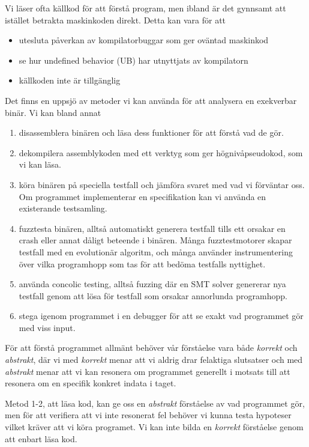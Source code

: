 
Vi läser ofta källkod för att förstå program, men ibland är det gynnsamt att istället betrakta
maskinkoden direkt. Detta kan vara för att
\begin{itemize}
  \item utesluta påverkan av kompilatorbuggar som ger oväntad maskinkod
  \item se hur undefined behavior (UB) har utnyttjats av kompilatorn
  \item källkoden inte är tillgänglig
\end{itemize}

Det finns en uppsjö av metoder vi kan använda för att analysera en exekverbar binär. Vi kan bland
annat
\begin{enumerate}
  \item disassemblera binären och läsa dess funktioner för att förstå vad de gör.
  \item dekompilera assemblykoden med ett verktyg som ger högnivåpseudokod, som vi kan läsa.
  \item köra binären på speciella testfall och jämföra svaret med vad vi förväntar oss. Om
    programmet implementerar en specifikation kan vi använda en existerande testsamling.
  \item fuzztesta binären, alltså automatiskt generera testfall tills ett orsakar en crash eller
    annat dåligt beteende i binären. Många fuzztestmotorer skapar testfall med en evolutionär
    algoritm, och många använder instrumentering över vilka programhopp som tas för att bedöma
    testfalls nyttighet.
  \item använda concolic testing, alltså fuzzing där en SMT solver genererar nya testfall genom att
    lösa för testfall som orsakar annorlunda programhopp.
  \item stega igenom programmet i en debugger för att se exakt vad programmet gör med viss input.
\end{enumerate}

För att förstå programmet allmänt behöver vår förståelse vara både \textit{korrekt} och
\textit{abstrakt}, där vi med \textit{korrekt} menar att vi aldrig drar felaktiga slutsatser och med
\textit{abstrakt} menar att vi kan resonera om programmet generellt i motsats till att resonera om en
specifik konkret indata i taget.

Metod 1-2, att läsa kod, kan ge oss en \textit{abstrakt} förståelse av vad programmet gör, men för
att verifiera att vi inte resonerat fel behöver vi kunna testa hypoteser vilket kräver att vi köra
programet. Vi kan inte bilda en \textit{korrekt} förståelse genom att enbart läsa kod.

